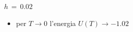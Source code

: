 \begin{frame}
\begin{columns}
\begin{column}{0.5\textwidth}
\begin{block}{$h\,=\,0.02$}
                \vspace{0.5cm}
                \begin{itemize}[itemsep=0.5em, label=$\diamond$]
                    \item per $T \to 0$ l'energia $U\left(T\right) \to -1.02$
                \end{itemize}
            
            \end{block}
        \end{column}
    \end{columns}

\end{frame}



